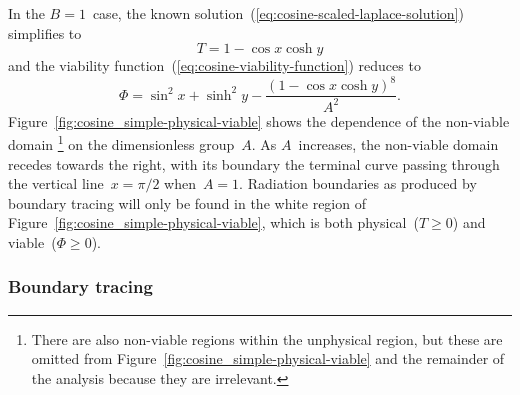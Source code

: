 In the $B = 1$~case,
the known solution~(\ref{eq:cosine-scaled-laplace-solution}) simplifies to
\begin{equation}
  T = 1 - \cos x \cosh y
  \label{eq:cosine-simple-laplace-solution}
\end{equation}
and the viability function~(\ref{eq:cosine-viability-function}) reduces to
\begin{equation}
  \Phi = \sin^2 x + \sinh^2 y - \frac{(1 - \cos x \cosh y) ^ 8}{A^2}.
  \label{eq:cosine-simple-viability-function}
\end{equation}
Figure~\ref{fig:cosine_simple-physical-viable} shows
the dependence of the non-viable domain%
\footnote{
  There are also non-viable regions within the unphysical region,
  but these are omitted from Figure~\ref{fig:cosine_simple-physical-viable}
  and the remainder of the analysis because they are irrelevant.
}
on the dimensionless group~$A$.
As $A$~increases, the non-viable domain recedes towards the right,
with its boundary the terminal curve
passing through the vertical line~$x = \pi/2$ when~$A = 1$.
Radiation boundaries as produced by boundary tracing will only be found
in the white region of Figure~\ref{fig:cosine_simple-physical-viable},
which is both physical~($T \ge 0$) and viable~($\Phi \ge 0$).

\begin{figure}
\end{figure}

\subsubsection{Boundary tracing}
\label{sec:cartesian.cosine.simple.tracing}

